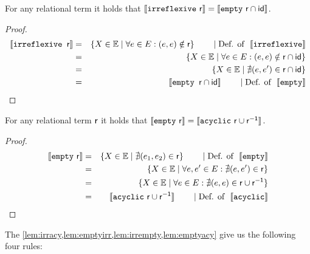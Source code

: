 \documentclass[a4paper,twoside,12pt, english]{article}
\begin{document}
\begin{lemma}\label{lem:irrempty}
For any relational term \relr{} it holds that $\llbracket \mathtt{irreflexive}~ \sf r \rrbracket = \llbracket \mathtt{empty}~ \textsf{\upshape r} \cap \textsf{\upshape id} \rrbracket$.
\end{lemma}
\begin{proof}
\begin{eqnarray*}
\llbracket \texttt{irreflexive } \textsf{\upshape r} \rrbracket &=& \{X \in \mathbb{E} \mid \forall e \in E: (e,e) \notin \textsf{\upshape r}\} \qquad \mid \text{Def. of }~ \llbracket \texttt{irreflexive} \rrbracket \\
&=& \{X \in \mathbb{E} \mid \forall e \in E: (e,e) \notin \textsf{\upshape r} \cap \textsf{\upshape id}\} \\
&=& \{X \in \mathbb{E} \mid \nexists (e,e') \in \textsf{\upshape r} \cap \textsf{\upshape id}\} \\
&=& \llbracket \texttt{empty } \textsf{\upshape r} \cap \textsf{\upshape id} \rrbracket \qquad \mid \text{Def. of }~ \llbracket \texttt{empty} \rrbracket
\end{eqnarray*}
\end{proof}
\pagebreak
\begin{lemma}\label{lem:emptyacy}
For any relational term $\textsf{\upshape r}$ it holds that $\llbracket \mathtt{empty}~ \sf r \rrbracket = \llbracket \mathtt{acyclic}~ \sf r \cup r^{-1} \rrbracket$.
\end{lemma}
\begin{proof}
\begin{eqnarray*}
\llbracket \texttt{empty}~ \sf r \rrbracket &=& \{X \in \mathbb{E} \mid \nexists (e_1,e_2) \in \sf r\} \qquad \mid \text{Def. of }~ \llbracket \texttt{empty} \rrbracket \\
&=& \{X \in \mathbb{E} \mid \forall e,e' \in E: \nexists (e,e') \in \sf r \} \\
&=& \{X \in \mathbb{E} \mid \forall e \in E: \nexists (e,e) \in \sf r \cup r^{-1} \} \\
&=& \llbracket \texttt{acyclic}~ \sf r \cup r^{-1} \rrbracket \qquad \mid \text{Def. of }~ \llbracket \texttt{acyclic} \rrbracket
\end{eqnarray*}
\end{proof}

\noindent The \cref{lem:irracy,lem:emptyirr,lem:irrempty,lem:emptyacy} give us the following four rules:
\end{document}
